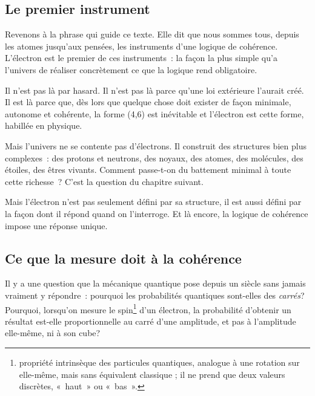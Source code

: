 \documentclass[12pt, a4paper, openright]{book}
\begin{document}
\subsection*{Le premier instrument}

Revenons à la phrase qui guide ce texte. Elle dit que nous sommes tous, depuis les atomes jusqu'aux pensées, les instruments d'une logique de cohérence. L'électron est le premier de ces instruments~: la façon la plus simple qu'a l'univers de réaliser concrètement ce que la logique rend obligatoire.

\medskip

Il n'est pas là par hasard. Il n'est pas là parce qu'une loi extérieure l'aurait créé. Il est là parce que, dès lors que quelque chose doit exister de façon minimale, autonome et cohérente, la forme (4,6) est inévitable et l'électron est cette forme, habillée en physique.

\medskip

Mais l'univers ne se contente pas d'électrons. Il construit des structures bien plus complexes~: des protons et neutrons, des noyaux, des atomes, des molécules, des étoiles, des êtres vivants. Comment passe-t-on du battement minimal à toute cette richesse~? C'est la question du chapitre suivant.

\medskip

Mais l'électron n'est pas seulement défini par sa structure, il est aussi défini par la façon dont il répond quand on l'interroge. Et là encore, la logique de cohérence impose une réponse unique.

\subsection*{Ce que la mesure doit à la cohérence}

Il y a une question que la mécanique quantique pose depuis un siècle sans jamais vraiment y répondre~: pourquoi les probabilités quantiques sont-elles des \emph{carrés}? Pourquoi, lorsqu'on mesure le spin\footnote{propriété intrinsèque des particules quantiques, analogue à une rotation sur elle-même, mais sans équivalent classique ; il ne prend que deux valeurs discrètes, «~haut~» ou «~bas~».} d'un électron, la probabilité d'obtenir un résultat est-elle proportionnelle au carré d'une amplitude, et pas à l'amplitude elle-même, ni à son cube?

\medskip
\end{document}

